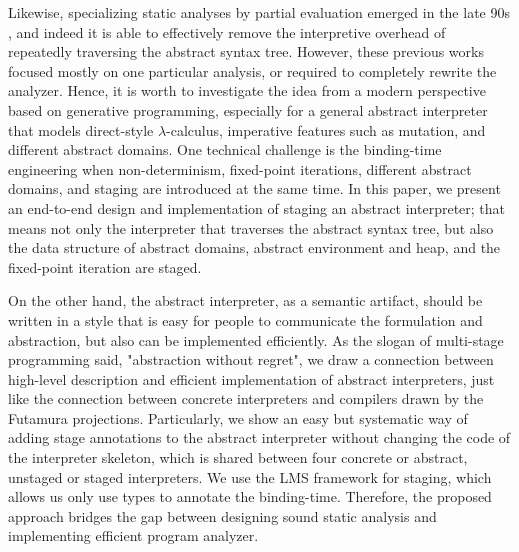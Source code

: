 \iffalse
Likewise, specializing static analyses by partial evaluation emerged in the late 90s
, and indeed it is able to effectively remove the interpretive
overhead of repeatedly traversing the abstract syntax tree. However, these
previous works focused mostly on one particular analysis, or required to
completely rewrite the analyzer. Hence, it is worth to investigate the idea from
a modern perspective based on generative programming, especially for a general
abstract interpreter that models direct-style $\lambda$-calculus, imperative
features such as mutation, and different abstract domains. One technical
challenge is the binding-time engineering when non-determinism, fixed-point
iterations, different abstract domains, and staging are introduced at the same
time. In this paper, we present an end-to-end design and implementation of
staging an abstract interpreter; that means not only the interpreter that
traverses the abstract syntax tree, but also the data structure of abstract
domains, abstract environment and heap, and the fixed-point iteration are
staged.

On the other hand, the abstract interpreter, as a semantic artifact, should be
written in a style that is easy for people to communicate the formulation and
abstraction, but also can be implemented efficiently. As the slogan of
multi-stage programming said, "abstraction without regret", we draw a connection
between high-level description and efficient implementation of abstract
interpreters, just like the connection between concrete interpreters and
compilers drawn by the Futamura projections. Particularly, we show an easy but
systematic way of adding stage annotations to the abstract interpreter without
changing the code of the interpreter skeleton, which is shared between four concrete
or abstract, unstaged or staged interpreters. We use the LMS framework for staging,
which allows us only use types to annotate the binding-time. Therefore, the
proposed approach bridges the gap between designing sound static analysis and
implementing efficient program analyzer.


